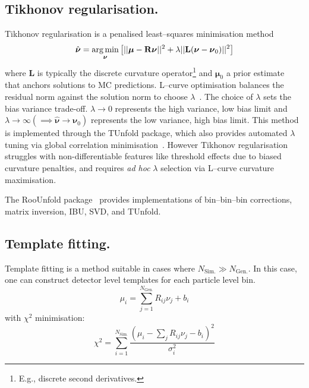 \subsection{Tikhonov regularisation.}  
Tikhonov regularisation is a penalised least--squares minimisation method
\begin{equation}
    \hat{\boldsymbol{\nu}} =\underset{\boldsymbol{\nu}}{\arg\min} \left[ ||\vb*{\mu} - \mathbf{R}\boldsymbol{\nu}||^2 + \lambda ||\mathbf{L}(\boldsymbol{\nu} - \boldsymbol{\nu}_0)||^2 \right]
\end{equation}  
where \(\mathbf{L}\) is typically the discrete curvature operator\footnote{E.g., discrete second derivatives.} and \(\boldsymbol{\mu}_0\) a prior estimate~\cite{cowan_topics_2009} that anchors solutions to MC predictions.
%
L--curve optimisation balances the residual norm against the solution norm to choose \(\lambda\)~\cite{cowan_highlights_2011}.
%
The choice of \(\lambda\) sets the bias variance trade-off.
%
\(\lambda \rightarrow 0\) represents the high variance, low bias limit and \(\lambda \rightarrow \infty (\implies \hat{\boldsymbol{\nu}} \rightarrow \boldsymbol{\nu}_0)\) represents the low variance, high bias limit.
%
This method is implemented through the TUnfold package, which also provides automated \(\lambda\) tuning via global correlation minimisation~\cite{schmitt_tunfold_2012}.
%
However Tikhonov regularisation struggles with non-differentiable features like threshold effects due to biased curvature penalties, and requires \textit{ad hoc} \(\lambda\) selection via L--curve curvature maximisation.

\begin{note*}
    The RooUnfold package~\cite{adye_unfolding_2011} provides implementations of bin--bin--bin corrections, matrix inversion, IBU, SVD, and TUnfold.
\end{note*}
\subsection{Template fitting.}  
Template fitting is a method suitable in cases where \(N_{\text{Sim.}} \gg N_{\text{Gen.}}\).
%
In this case, one can construct detector level templates for each particle level bin. 
\begin{equation}
    \mu_i = \sum_{j=1}^{N_{\text{Gen.}}} R_{ij} \nu_j + b_i
\end{equation}  
with \(\chi^2\) minimisation:  
\begin{equation}
    \chi^2 = \sum_{i=1}^{N_{\text{Sim.}}} \frac{(\mu_i - \sum_j R_{ij}\nu_j - b_i)^2}{\sigma_i^2}
\end{equation}  

